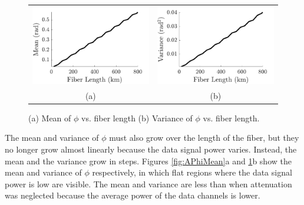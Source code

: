 %
\begin{figure}[htb]
	\raggedright
	\begin{tabular}{c c}
		\includegraphics[width=0.5\linewidth]{img/APhiMean} & \includegraphics[width=0.5\linewidth]{img/APhiVar} \\
		(a) & (b)
	\end{tabular}
	\renewcommand{\baselinestretch}{1}
	\small\normalsize
	\caption{(a)\label{fig:APhiMean} Mean of $\phi$ vs. fiber length (b)\label{fig:APhiVar} Variance of $\phi$ vs. fiber length.}
\end{figure}
\renewcommand{\baselinestretch}{2}
\small\normalsize

The mean and variance of $\phi$ must also grow over the length of the fiber, but they no longer grow almost linearly because the data signal power varies. Instead, the mean and the variance grow in steps. Figures \ref{fig:APhiMean}a and \ref{fig:APhiVar}b show the mean and variance of $\phi$ respectively, in which flat regions where the data signal power is low are visible. The mean and variance are less than when attenuation was neglected because the average power of the data channels is lower.

